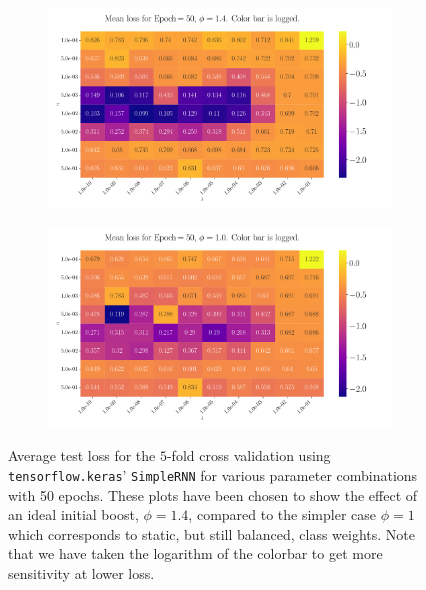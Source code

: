 \documentclass[%
reprint,
amsmath,amssymb,
aps,
]{revtex4-2}
\begin{document}
\begin{figure}[ht!]
	\begin{subfigure}{0.499\textwidth}
		\includegraphics[width=\textwidth]{Figures/2D_Plot_Loss_Epoch50_Boost1.4.pdf}
	\end{subfigure}
	\newline
	\begin{subfigure}{0.499\textwidth}
		\includegraphics[width=\textwidth]{Figures/2D_Plot_Loss_Epoch50_Boost1.0.pdf}
	\end{subfigure}
	\caption{Average test loss for the $5$-fold cross validation using \texttt{tensorflow.keras}' \texttt{SimpleRNN} for various parameter combinations with 50 epochs. These plots have been chosen to show the effect of an ideal initial boost, $\phi=1.4$, compared to the simpler case $\phi=1$ which corresponds to static, but still balanced, class weights. Note that we have taken the logarithm of the colorbar to get more sensitivity at lower loss.}
	\label{fig:PhiShowcase}	
\end{figure}
\end{document}
